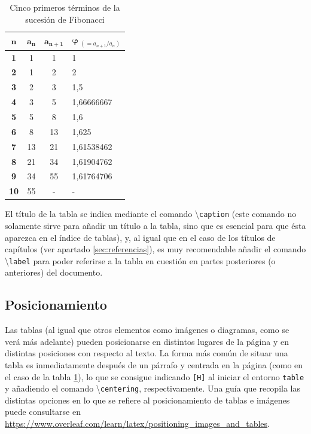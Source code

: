 \documentclass[a4paper, 11pt, spanish, twoside]{article}
\begin{document}
\vspace{25pt}

\begin{table}[H]
\centering
\begin{tabular}{|c|c|c|l|}
\hline
$\bm{n}$ & $\bm{a_n}$ & $\bm{a_{n+1}}$ & $\bm{\varphi} \ _{(= a_{n+1}/a_n)}$ \\ \hline\hline
\textbf{1} & 1 & 1 & 1 \\ \hline
\textbf{2} & 1 & 2 & 2 \\ \hline
\textbf{3} & 2 & 3 & 1,5 \\ \hline
\textbf{4} & 3 & 5 & 1,66666667 \\ \hline
\textbf{5} & 5 & 8 & 1,6 \\ \hline
\textbf{6} & 8 & 13 & 1,625 \\ \hline
\textbf{7} & 13 & 21 & 1,61538462 \\ \hline
\textbf{8} & 21 & 34 & 1,61904762 \\ \hline
\textbf{9} & 34 & 55 & 1,61764706 \\ \hline
\textbf{10} & 55 & - & - \\ \hline
\end{tabular}
\caption{Cinco primeros términos de la sucesión de Fibonacci}
\label{tabla:fibonacci5}
\end{table}

\vspace{5pt}

El título de la tabla se indica mediante el comando \textbackslash\texttt{caption} (este comando no solamente sirve para añadir un título a la tabla, sino que es esencial para que ésta aparezca en el índice de tablas), y, al igual que en el caso de los títulos de capítulos (ver apartado \ref{sec:referencias}), es muy recomendable añadir el comando \textbackslash\texttt{label} para poder referirse a la tabla en cuestión en partes posteriores (o anteriores) del documento.


\subsection{Posicionamiento}

Las tablas (al igual que otros elementos como imágenes o diagramas, como se verá más adelante) pueden posicionarse en distintos lugares de la página y en distintas posiciones con respecto al texto. La forma más común de situar una tabla es inmediatamente después de un párrafo y centrada en la página (como en el caso de la tabla \ref{tabla:fibonacci5}), lo que se consigue indicando \texttt{[H]} al iniciar el entorno \texttt{table} y añadiendo el comando \textbackslash\texttt{centering}, respectivamente. Una guía que recopila las distintas opciones en lo que se refiere al posicionamiento de tablas e imágenes puede consultarse en \url{https://www.overleaf.com/learn/latex/positioning_images_and_tables}.
\end{document}
